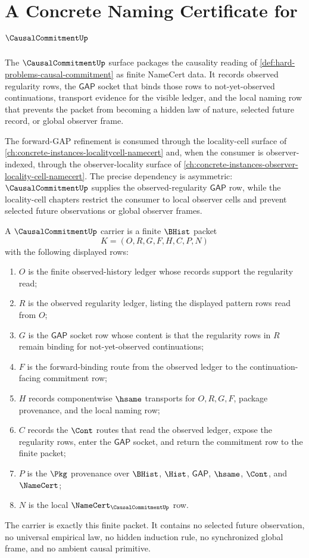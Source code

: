 \chapter{A Concrete Naming Certificate for $\CausalCommitmentUp$}
\label{ch:concrete-instances-causalcommitment-namecert}

The $\CausalCommitmentUp$ surface packages the causality reading of \autoref{def:hard-problems-causal-commitment} as finite NameCert data. It records observed regularity rows, the $\mathsf{GAP}$ socket that binds those rows to not-yet-observed continuations, transport evidence for the visible ledger, and the local naming row that prevents the packet from becoming a hidden law of nature, selected future record, or global observer frame.

The forward-GAP refinement is consumed through the locality-cell surface of \autoref{ch:concrete-instances-localitycell-namecert} and, when the consumer is observer-indexed, through the observer-locality surface of \autoref{ch:concrete-instances-observer-locality-cell-namecert}. The precise dependency is asymmetric: $\CausalCommitmentUp$ supplies the observed-regularity $\mathsf{GAP}$ row, while the locality-cell chapters restrict the consumer to local observer cells and prevent selected future observations or global observer frames.

\begin{definition}
\label{def:causal-commitment-namecert-carrier}
A $\CausalCommitmentUp$ carrier is a finite $\BHist$ packet
$$
K=(O,R,G,F,H,C,P,N)
$$
with the following displayed rows:
\begin{enumerate}
\item $O$ is the finite observed-history ledger whose records support the regularity read;
\item $R$ is the observed regularity ledger, listing the displayed pattern rows read from $O$;
\item $G$ is the $\mathsf{GAP}$ socket row whose content is that the regularity rows in $R$ remain binding for not-yet-observed continuations;
\item $F$ is the forward-binding route from the observed ledger to the continuation-facing commitment row;
\item $H$ records componentwise $\hsame$ transports for $O,R,G,F$, package provenance, and the local naming row;
\item $C$ records the $\Cont$ routes that read the observed ledger, expose the regularity rows, enter the $\mathsf{GAP}$ socket, and return the commitment row to the finite packet;
\item $P$ is the $\Pkg$ provenance over $\BHist$, $\Hist$, $\mathsf{GAP}$, $\hsame$, $\Cont$, and $\NameCert$;
\item $N$ is the local $\NameCert_{\CausalCommitmentUp}$ row.
\end{enumerate}
The carrier is exactly this finite packet. It contains no selected future observation, no universal empirical law, no hidden induction rule, no synchronized global frame, and no ambient causal primitive.
\end{definition}

